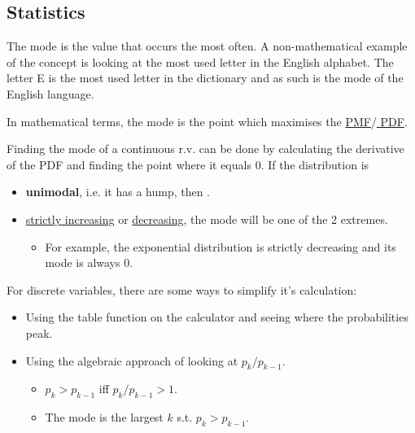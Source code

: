 \documentclass[english]{article}
\begin{document}
\begin{multicols*}{2}

\section{Statistics}\label{sec:01Statistics}
\begin{definitionNOHFILL}[Mode]
\begin{rappel_enhanced}[Context]
The mode is the value that occurs the most often. A non-mathematical example of the concept is looking at the most used letter in the English alphabet. The letter E is the most used letter in the dictionary and as such is the mode of the English language.
\end{rappel_enhanced}

In mathematical terms, the mode is the point which maximises the \hyperlink{0pmf}{\color{bleudefrance} PMF}/\hyperlink{0pdf}{\color{bleudefrance} PDF}.

\bigskip

Finding the mode of a continuous r.v. can be done by calculating the derivative of the PDF and finding the point where it equals $0$.  If the distribution is
\begin{itemize}
	\item	\textbf{unimodal}, i.e. it has a hump, then .
	\item	\underline{strictly increasing} or \underline{decreasing}, the mode will be one of the 2 extremes.
		\begin{itemize}
		\item	For example, the exponential distribution is strictly decreasing and its mode is always $0$.
		\end{itemize}
\end{itemize}

\bigskip

For discrete variables, there are some ways to simplify it's calculation:
\begin{itemize}
	\item	Using the table function on the calculator and seeing where the probabilities peak.
	\item	Using the algebraic approach of looking at $p_{k} / p_{k - 1}$.
		\begin{itemize}
		\item	$p_{k} > p_{k - 1}$ iff $p_{k}/p_{k - 1} > 1$.
		\item	The mode is the largest $k$ s.t. $p_{k} > p_{k - 1}$.
		\end{itemize}
\end{itemize}


\end{definitionNOHFILL}
\end{multicols*}
\end{document}
